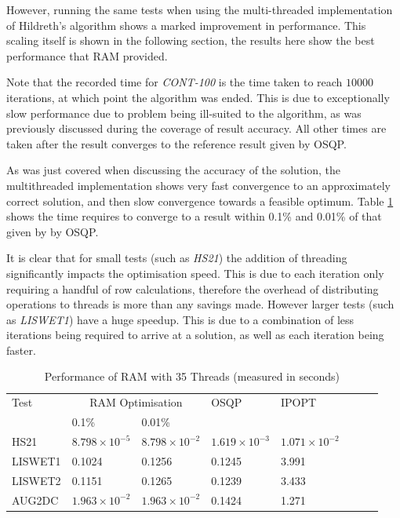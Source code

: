 However, running the same tests when using the multi-threaded implementation of Hildreth's algorithm shows a marked improvement in performance. This scaling itself is shown in the following section, the results here show the best performance that RAM provided. 

Note that the recorded time for \textit{CONT-100} is the time taken to reach $10000$ iterations, at which point the algorithm was ended. This is due to exceptionally slow performance due to problem being ill-suited to the algorithm, as was previously discussed during the coverage of result accuracy. All other times are taken after the result converges to the reference result given by OSQP.

As was just covered when discussing the accuracy of the solution, the multithreaded implementation shows very fast convergence to an approximately correct solution, and then slow convergence towards a feasible optimum. Table \ref{table:multi_performance} shows the time requires to converge to a result within 0.1\% and 0.01\% of that given by by OSQP. 

It is clear that for small tests (such as \textit{HS21}) the addition of threading significantly impacts the optimisation speed. This is due to each iteration only requiring a handful of row calculations, therefore the overhead of distributing operations to threads is more than any savings made. However larger tests (such as \textit{LISWET1}) have a huge speedup. This is due to a combination of less iterations being required to arrive at a solution, as well as each iteration being faster. 

\begin{table}[h] 
\centering
\begin{tabular}{llllllll} \toprule
    {Test}      & \multicolumn{2}{c}{RAM Optimisation}  & {OSQP}   & {IPOPT}    \\ 
                & 0.1\%                 & 0.01\%                    &          &            \\ \midrule
    {HS21}      & $8.798\times10^{-5}$  & $8.798\times10^{-2}$      & $1.619\times10^{-3}$ & $1.071\times10^{-2}$\\ 
    {LISWET1}   & 0.1024                & 0.1256                    & 0.1245   & 3.991      \\ 
    {LISWET2}   & 0.1151                & 0.1265                    & 0.1239   & 3.433      \\ 
    {AUG2DC}    & $1.963\times10^{-2}$  & $1.963\times10^{-2}$      & 0.1424   & 1.271      \\ \bottomrule
\end{tabular}
    \caption{\label{table:multi_performance}Performance of RAM with 35 Threads (measured in seconds)}
\end{table}

